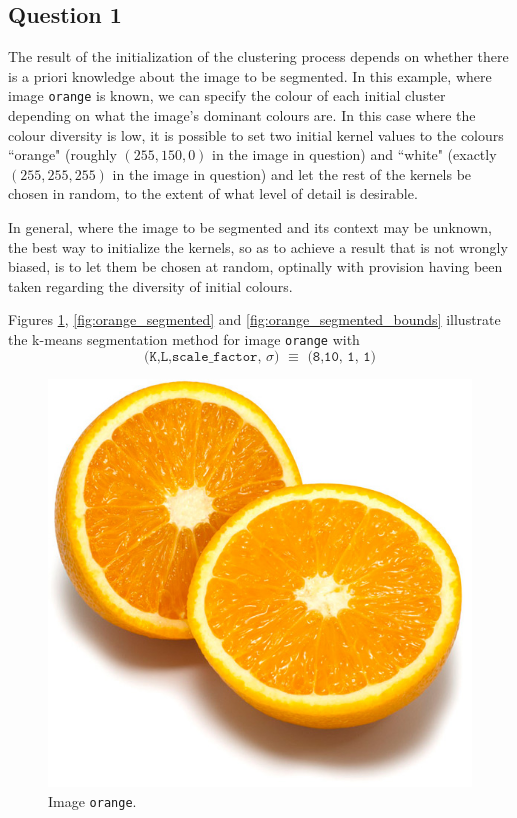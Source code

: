 \subsection{Question 1}

The result of the initialization of the clustering process depends on whether
there is a priori knowledge about the image to be segmented. In this example,
where image \texttt{orange} is known, we can specify the colour of each initial
cluster depending on what the image's dominant colours are. In this case where
the colour diversity is low, it is possible to set two initial kernel values
to the colours ``orange" (roughly $(255,150,0)$ in the image in question)
and ``white" (exactly $(255,255,255)$ in the image in question)
and let the rest of the kernels be chosen in random,
to the extent of what level of detail is desirable.

In general, where the image to be segmented and its context may be unknown,
the best way to initialize the kernels, so as to achieve a result that is not
wrongly biased, is to let them be chosen at random, optinally with provision
having been taken regarding the diversity of initial colours.

Figures \ref{fig:orange}, \ref{fig:orange_segmented}
and \ref{fig:orange_segmented_bounds} illustrate the k-means segmentation
method for image \texttt{orange} with
$$\texttt{(K,L,scale\_factor, $\sigma$) $\equiv$ (8,10, 1, 1)}$$


\begin{figure}[H]
	\centering
  \includegraphics[scale=0.4]{../../bildat_lab3/orange.jpg}
  \caption{Image \texttt{orange}.}
  \label{fig:orange}
\end{figure}



